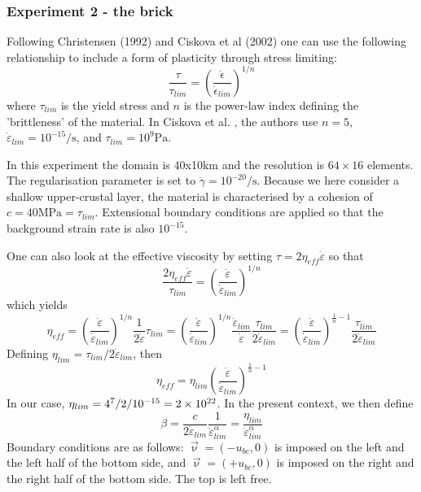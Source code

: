 \newpage
\subsubsection*{Experiment 2 - the brick }

Following Christensen (1992) \cite{chri92} and Ciskova et al (2002) \cite{civv02} 
one can use the following relationship to include a form of plasticity through stress limiting:
\[
\frac{\tau}{\tau_{lim}} = \left( \frac{ \dot{\epsilon}  }{ \dot{\epsilon}_{lim}  }  \right)^{1/n}
\]
where $\tau_{lim}$ is the yield stress and $n$ is the power-law index defining the 'brittleness'
of the material.
In Ciskova et al. \cite{civv02}, 
the authors use $n=5$, $\dot{\varepsilon}_{lim}=10^{-15}\si{\per\second}$, 
and $\tau_{lim}=10^{9}\si{\pascal}$. 

In this experiment the domain is 40x10\si{\kilo\metre} and the resolution is $64\times 16$ elements. 
The regularisation parameter is set to $\dot{\gamma}=10^{-20}\si{\per\second}$.
Because we here consider a shallow upper-crustal 
layer, the material is characterised by a cohesion of $c=40\si{\mega\pascal}=\tau_{lim}$.
Extensional boundary conditions are applied so that the background strain rate is also $10^{-15}$.

One can also look at the effective viscosity by 
setting $\tau = 2 \eta_{eff} \dot{\varepsilon}$ so that
\[
\frac{2 \eta_{eff}\dot{\varepsilon} }{\tau_{lim}} = 
\left( \frac{ \dot{\varepsilon}  }{ \dot{\varepsilon}_{lim}  }  \right)^{1/n}
\]
which yields
\[
\eta_{eff} = \left( \frac{ \dot{\varepsilon}  }{ \dot{\varepsilon}_{lim} } \right)^{1/n}   
\frac{1}{ 2\dot{\varepsilon}} \tau_{lim}
=
\left( \frac{ \dot{\varepsilon}  }{ \dot{\varepsilon}_{lim}  }  \right)^{1/n} 
\frac{\dot{\varepsilon}_{lim} }{\dot{\varepsilon}} \frac{\tau_{lim}   }{2 \dot{\varepsilon}_{lim}} 
=
\left( \frac{ \dot{\varepsilon}  }{ \dot{\varepsilon}_{lim}  }  \right)^{\frac{1}{n}-1}  
\frac{\tau_{lim}   }{2 \dot{\varepsilon}_{lim}} 
\]
Defining $\eta_{lim}=\tau_{lim} /  2 \dot{\varepsilon}_{lim}$, then
\[
\eta_{eff} = \eta_{lim} \left( \frac{ \dot{\varepsilon}  }{ \dot{\varepsilon}_{lim}  }  
\right)^{\frac{1}{n}-1}
\]
In our case, $\eta_{lim}= 4\time 10^7/2/10^{-15}=2\times10^{22}$. 
In the present context, we then define
\[
\beta 
= \frac{c}{2 \dot{\varepsilon}_{lim}} \frac{1}{\dot{\varepsilon}_{lim}^{\alpha}}
= \frac{ \eta_{lim} }{\dot{\varepsilon}_{lim}^{\alpha}}
\]
Boundary conditions are as follows: $\vec{\upnu}=(-u_{bc},0)$ is imposed on the left and the left half 
of the bottom side, and $\vec{\upnu}=(+u_{bc},0)$ is imposed on the right and the right half
of the bottom side. The top is left free.  



